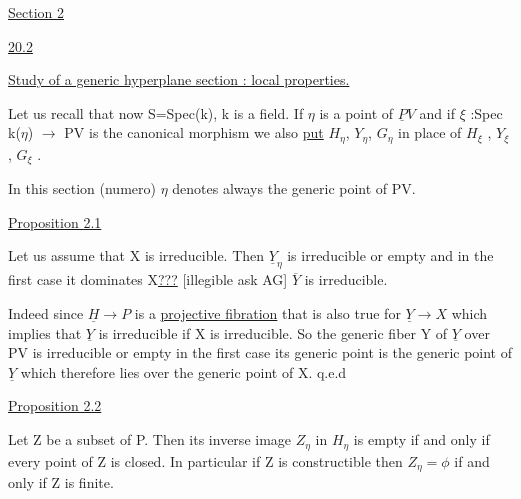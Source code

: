 
\uline{Section 2}

\uline{20.2}

\uline{Study of a generic hyperplane section : local properties.}

Let us recall that now S=Spec(k), k is a field.  If $\eta$ is a
point of $\underline{P}V$ and if $\xi$ :Spec k($\eta$) $\rightarrow$ PV is the canonical morphism we
also \uline{put} $H_{\eta}$, $Y_{\eta}$, $G_{\eta}$ in place of $H_{\xi}$ , $Y_{\xi}$ , $G_{\xi}$ .

In this section (numero) $\eta$ denotes always the generic point
of PV.

\uline{Proposition 2.1}

Let us assume that X is irreducible.  Then $\underline{Y}_{\eta}$ is irreducible
or empty and in the first case it dominates X\uline{???} [illegible ask
AG] $\overline{Y}$ is irreducible.

Indeed since $\underline{H} \rightarrow P$ is a \uline{projective fibration} that is also
true for $\underline{Y} \rightarrow X$ which implies that $\underline{Y}$ is irreducible if X is
irreducible.  So the generic fiber Y of $\underline{Y}$ over PV is irreducible or
empty in the first case its generic point is the generic point of
$\underline{Y}$ which therefore lies over the generic point of X.  q.e.d

\uline{Proposition 2.2}

Let Z be a subset of P.  Then its inverse image $Z_{\eta}$ in $H_{\eta}$ is
empty if and only if every point of Z is closed.  In particular if
Z is constructible then $Z_{\eta} = \phi$ if and only if Z is finite.
